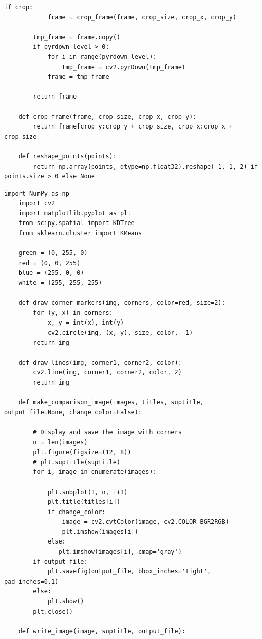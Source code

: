 \documentclass[11pt, conference, letterpaper]{IEEEtran}
\begin{document}
\begin{lstlisting}[style=python, caption={\texttt{video\_utils.py}}, label={lst:vutils}]
        if crop:
            frame = crop_frame(frame, crop_size, crop_x, crop_y)
         
        tmp_frame = frame.copy()
        if pyrdown_level > 0:
            for i in range(pyrdown_level):
                tmp_frame = cv2.pyrDown(tmp_frame)
            frame = tmp_frame
    
        return frame
        
    def crop_frame(frame, crop_size, crop_x, crop_y):
        return frame[crop_y:crop_y + crop_size, crop_x:crop_x + crop_size]
    
    def reshape_points(points):
        return np.array(points, dtype=np.float32).reshape(-1, 1, 2) if points.size > 0 else None
\end{lstlisting}

\begin{lstlisting}[style=python, caption={\texttt{plot\_utils.py}}, label={lst:putils}]
    import NumPy as np
    import cv2
    import matplotlib.pyplot as plt
    from scipy.spatial import KDTree
    from sklearn.cluster import KMeans
    
    green = (0, 255, 0)
    red = (0, 0, 255)
    blue = (255, 0, 0)
    white = (255, 255, 255)
    
    def draw_corner_markers(img, corners, color=red, size=2):
        for (y, x) in corners:
            x, y = int(x), int(y)
            cv2.circle(img, (x, y), size, color, -1)
        return img
    
    def draw_lines(img, corner1, corner2, color):
        cv2.line(img, corner1, corner2, color, 2)
        return img
    
    def make_comparison_image(images, titles, suptitle, output_file=None, change_color=False):
        
        # Display and save the image with corners
        n = len(images)
        plt.figure(figsize=(12, 8))
        # plt.suptitle(suptitle)
        for i, image in enumerate(images):
    
            plt.subplot(1, n, i+1)
            plt.title(titles[i])
            if change_color:
                image = cv2.cvtColor(image, cv2.COLOR_BGR2RGB)
                plt.imshow(images[i])
            else:
               plt.imshow(images[i], cmap='gray') 
        if output_file:
            plt.savefig(output_file, bbox_inches='tight', pad_inches=0.1)
        else:
            plt.show()
        plt.close() 
            
    def write_image(image, suptitle, output_file):
        

\end{lstlisting}
\end{document}
